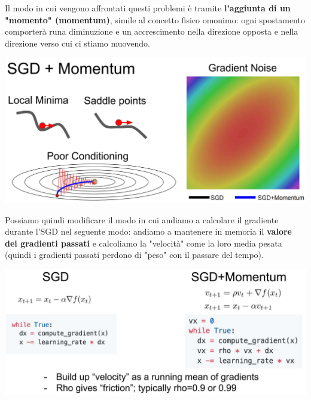 \documentclass[12pt]{article}
\begin{document}
Il modo in cui vengono affrontati questi problemi è tramite \textbf{l'aggiunta di un "momento" (momentum)}, simile al concetto fisico omonimo: ogni spostamento comporterà runa diminuzione e un accrescimento nella direzione opposta e nella direzione verso cui ci stiamo muovendo.
\begin{center}
    \includegraphics[width =0.80\linewidth]{Images/168.PNG}
\end{center}
Possiamo quindi modificare il modo in cui andiamo a calcolare il gradiente durante l'SGD nel seguente modo: andiamo a mantenere in memoria il \textbf{valore dei gradienti passati} e calcoliamo la "velocità" come la loro media pesata (quindi i gradienti passati perdono di "peso" con il passare del tempo).
\begin{center}
    \includegraphics[width =0.80\linewidth]{Images/169.PNG}
\end{center}
\end{document}
